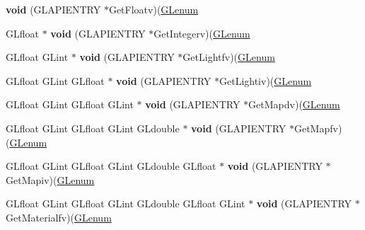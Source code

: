 \begin{DoxyCompactItemize}
{\bfseries void} (G\+L\+A\+P\+I\+E\+N\+T\+RY $\ast$Get\+Floatv)(\hyperlink{interfacevoid}{G\+Lenum}
\item 
\mbox{\label{struct_____g_ldispatch_table_rec_ab1a0fa5b97e77e5cf443fe51c86e14ce}} 
G\+Lfloat $\ast$ {\bfseries void} (G\+L\+A\+P\+I\+E\+N\+T\+RY $\ast$Get\+Integerv)(\hyperlink{interfacevoid}{G\+Lenum}
\item 
\mbox{\label{struct_____g_ldispatch_table_rec_a9d4c0a8c4e49ac6515586289604d67e2}} 
G\+Lfloat G\+Lint $\ast$ {\bfseries void} (G\+L\+A\+P\+I\+E\+N\+T\+RY $\ast$Get\+Lightfv)(\hyperlink{interfacevoid}{G\+Lenum}
\item 
\mbox{\label{struct_____g_ldispatch_table_rec_a18300b12bea59a723b5297bf0bb0cf8e}} 
G\+Lfloat G\+Lint G\+Lfloat $\ast$ {\bfseries void} (G\+L\+A\+P\+I\+E\+N\+T\+RY $\ast$Get\+Lightiv)(\hyperlink{interfacevoid}{G\+Lenum}
\item 
\mbox{\label{struct_____g_ldispatch_table_rec_a9dd9ad27e2c8e154a0af1c22c5110649}} 
G\+Lfloat G\+Lint G\+Lfloat G\+Lint $\ast$ {\bfseries void} (G\+L\+A\+P\+I\+E\+N\+T\+RY $\ast$Get\+Mapdv)(\hyperlink{interfacevoid}{G\+Lenum}
\item 
\mbox{\label{struct_____g_ldispatch_table_rec_ad2d1ad4a953076c7d8f7b8528fde16c8}} 
G\+Lfloat G\+Lint G\+Lfloat G\+Lint G\+Ldouble $\ast$ {\bfseries void} (G\+L\+A\+P\+I\+E\+N\+T\+RY $\ast$Get\+Mapfv)(\hyperlink{interfacevoid}{G\+Lenum}
\item 
\mbox{\label{struct_____g_ldispatch_table_rec_a1a9bf86de8762e9c2887bd25b00b7b69}} 
G\+Lfloat G\+Lint G\+Lfloat G\+Lint G\+Ldouble G\+Lfloat $\ast$ {\bfseries void} (G\+L\+A\+P\+I\+E\+N\+T\+RY $\ast$Get\+Mapiv)(\hyperlink{interfacevoid}{G\+Lenum}
\item 
\mbox{\label{struct_____g_ldispatch_table_rec_a26bcc0c99755c4a09141e3a820d0b238}} 
G\+Lfloat G\+Lint G\+Lfloat G\+Lint G\+Ldouble G\+Lfloat G\+Lint $\ast$ {\bfseries void} (G\+L\+A\+P\+I\+E\+N\+T\+RY $\ast$Get\+Materialfv)(\hyperlink{interfacevoid}{G\+Lenum}
\item 

\end{DoxyCompactItemize}
